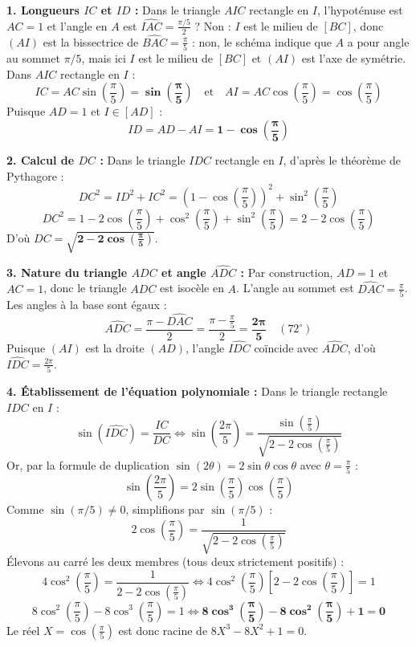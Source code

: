 \documentclass[11pt,a4paper]{article}
\begin{document}
\begin{correctionbox}
\textbf{1. Longueurs $IC$ et $ID$ :}
Dans le triangle $AIC$ rectangle en $I$, l'hypoténuse est $AC = 1$ et l'angle en $A$ est $\widehat{IAC} = \frac{\pi/5}{2}$ ? Non : $I$ est le milieu de $[BC]$, donc $(AI)$ est la bissectrice de $\widehat{BAC} = \frac{\pi}{5}$ : non, le schéma indique que $A$ a pour angle au sommet $\pi/5$, mais ici $I$ est le milieu de $[BC]$ et $(AI)$ est l'axe de symétrie.
Dans $AIC$ rectangle en $I$ :
\[
IC = AC \sin\left(\frac{\pi}{5}\right) = \mathbf{\sin\left(\frac{\pi}{5}\right)} \quad \text{et} \quad AI = AC \cos\left(\frac{\pi}{5}\right) = \cos\left(\frac{\pi}{5}\right)
\]
Puisque $AD = 1$ et $I \in [AD]$ :
\[
ID = AD - AI = \mathbf{1 - \cos\left(\frac{\pi}{5}\right)}
\]

\textbf{2. Calcul de $DC$ :}
Dans le triangle $IDC$ rectangle en $I$, d'après le théorème de Pythagore :
\[
DC^2 = ID^2 + IC^2 = \left(1 - \cos\left(\frac{\pi}{5}\right)\right)^2 + \sin^2\left(\frac{\pi}{5}\right)
\]
\[
DC^2 = 1 - 2\cos\left(\frac{\pi}{5}\right) + \cos^2\left(\frac{\pi}{5}\right) + \sin^2\left(\frac{\pi}{5}\right) = 2 - 2\cos\left(\frac{\pi}{5}\right)
\]
D'où $DC = \mathbf{\sqrt{2 - 2\cos\left(\frac{\pi}{5}\right)}}$.

\textbf{3. Nature du triangle $ADC$ et angle $\widehat{ADC}$ :}
Par construction, $AD = 1$ et $AC = 1$, donc le triangle $ADC$ est isocèle en $A$.
L'angle au sommet est $\widehat{DAC} = \frac{\pi}{5}$.
Les angles à la base sont égaux :
\[
\widehat{ADC} = \frac{\pi - \widehat{DAC}}{2} = \frac{\pi - \frac{\pi}{5}}{2} = \mathbf{\frac{2\pi}{5}} \quad (72^\circ)
\]
Puisque $(AI)$ est la droite $(AD)$, l'angle $\widehat{IDC}$ coïncide avec $\widehat{ADC}$, d'où $\widehat{IDC} = \frac{2\pi}{5}$.

\textbf{4. Établissement de l'équation polynomiale :}
Dans le triangle rectangle $IDC$ en $I$ :
\[
\sin(\widehat{IDC}) = \frac{IC}{DC} \iff \sin\left(\frac{2\pi}{5}\right) = \frac{\sin\left(\frac{\pi}{5}\right)}{\sqrt{2 - 2\cos\left(\frac{\pi}{5}\right)}}
\]
Or, par la formule de duplication $\sin(2\theta) = 2\sin\theta\cos\theta$ avec $\theta = \frac{\pi}{5}$ :
\[
\sin\left(\frac{2\pi}{5}\right) = 2\sin\left(\frac{\pi}{5}\right)\cos\left(\frac{\pi}{5}\right)
\]
Comme $\sin(\pi/5) \neq 0$, simplifions par $\sin(\pi/5)$ :
\[
2\cos\left(\frac{\pi}{5}\right) = \frac{1}{\sqrt{2 - 2\cos\left(\frac{\pi}{5}\right)}}
\]
Élevons au carré les deux membres (tous deux strictement positifs) :
\[
4\cos^2\left(\frac{\pi}{5}\right) = \frac{1}{2 - 2\cos\left(\frac{\pi}{5}\right)} \iff 4\cos^2\left(\frac{\pi}{5}\right) \left[2 - 2\cos\left(\frac{\pi}{5}\right)\right] = 1
\]
\[
8\cos^2\left(\frac{\pi}{5}\right) - 8\cos^3\left(\frac{\pi}{5}\right) = 1 \iff \mathbf{8\cos^3\left(\frac{\pi}{5}\right) - 8\cos^2\left(\frac{\pi}{5}\right) + 1 = 0}
\]
Le réel $X = \cos\left(\frac{\pi}{5}\right)$ est donc racine de $8X^3 - 8X^2 + 1 = 0$.


\end{correctionbox}
\end{document}

